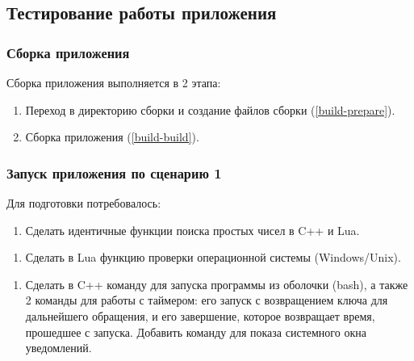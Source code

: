 \subsection{Тестирование работы приложения}

\subsubsection{Сборка приложения}
Сборка приложения выполняется в 2 этапа:
\begin{enumerate}
	\item Переход в директорию сборки и создание файлов сборки (\autoref{build-prepare}).
	\item Сборка приложения (\autoref{build-build}).
\end{enumerate}

\clearpage

\subsubsection{Запуск приложения по сценарию 1}
Для подготовки потребовалось:
\begin{enumerate}
	\item Сделать идентичные функции поиска простых чисел в C++ и Lua.
\end{enumerate}

\begin{enumerate}[resume]
	\item Сделать в Lua функцию проверки операционной системы (Windows/Unix).
\end{enumerate}

\begin{enumerate}[resume]
	\item Сделать в C++ команду для запуска программы из оболочки (bash), а также 2 команды для работы с таймером: его запуск с возвращением ключа для дальнейшего обращения, и его завершение, которое возвращает время, прошедшее с запуска. Добавить команду для показа системного окна уведомлений.
\end{enumerate}

